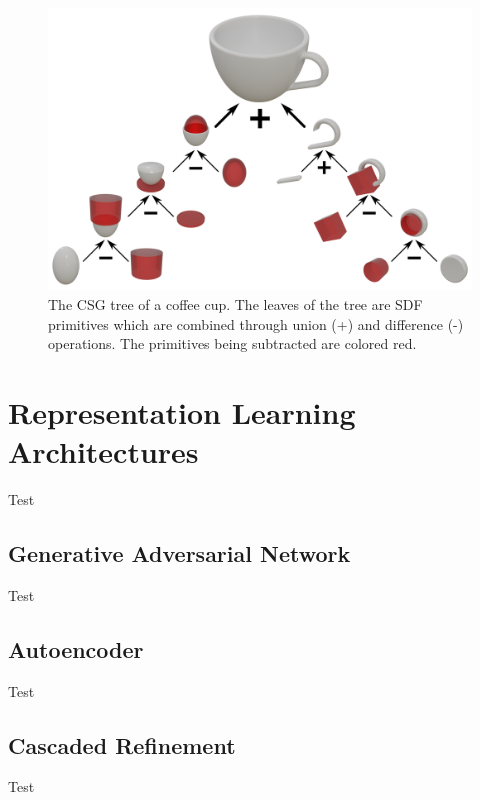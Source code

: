 \begin{figure}[h]
	\centering
	\includegraphics[scale=0.5]{Images/CSG Cup}
	\caption{The CSG tree of a coffee cup. The leaves of the tree are SDF primitives which are combined through union (+) and difference (-) operations. The primitives being subtracted are colored red.}
	\label{fig:csg_cup}
\end{figure}


\section{Representation Learning Architectures}
\label{sec:representation_learning_architectures}

Test

\subsection{Generative Adversarial Network}
\label{subsec:generative_adversarial_networks}

Test

\subsection{Autoencoder}
\label{subsec:autoencoders}

Test

\subsection{Cascaded Refinement}
\label{subsec:cascaded_refinement}

Test